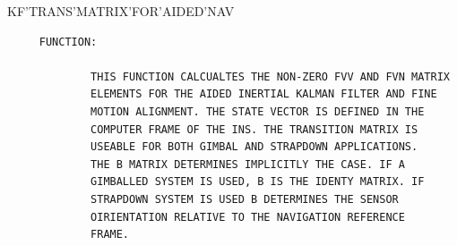 \begin{frame}
KF'TRANS'MATRIX'FOR'AIDED'NAV
\begin{verbatim}
     FUNCTION:

             THIS FUNCTION CALCUALTES THE NON-ZERO FVV AND FVN MATRIX
             ELEMENTS FOR THE AIDED INERTIAL KALMAN FILTER AND FINE
             MOTION ALIGNMENT. THE STATE VECTOR IS DEFINED IN THE
             COMPUTER FRAME OF THE INS. THE TRANSITION MATRIX IS
             USEABLE FOR BOTH GIMBAL AND STRAPDOWN APPLICATIONS.
             THE B MATRIX DETERMINES IMPLICITLY THE CASE. IF A
             GIMBALLED SYSTEM IS USED, B IS THE IDENTY MATRIX. IF
             STRAPDOWN SYSTEM IS USED B DETERMINES THE SENSOR
             OIRIENTATION RELATIVE TO THE NAVIGATION REFERENCE
             FRAME.

\end{verbatim}
\end{frame}
